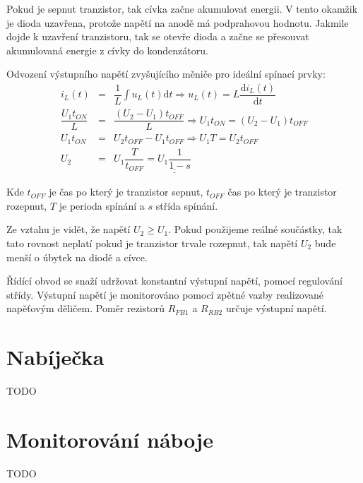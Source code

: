 Pokud je sepnut tranzistor, tak cívka začne akumulovat energii. V tento okamžik je dioda uzavřena, protože napětí na anodě má podprahovou hodnotu. Jakmile dojde k uzavření tranzistoru, tak se otevře dioda a začne se přesouvat akumulovaná energie z cívky do kondenzátoru.

Odvození výstupního napětí zvyšujícího měniče pro ideální spínací prvky:
\begin{eqnarray}
    i_L(t) &=& \dfrac{1}{L} \int u_L(t) \mathrm{d}t \Rightarrow u_L(t) = L \dfrac{\mathrm{d}i_L(t)}{\mathrm{d}t}
    \nonumber\\
    \dfrac{U_1 t_{ON}}{L} &=& \dfrac{(U_2 - U_1) t_{OFF}}{L} \Rightarrow U_1 t_{ON} = (U_2 - U_1) t_{OFF}
    \nonumber\\
    U_1 t_{ON} &=& U_2 t_{OFF} - U_1 t_{OFF} \Rightarrow U_1 T = U_2 t_{OFF}
    \nonumber\\
    U_2 &=& U_1 \dfrac{T}{t_{OFF}} = \underline{\underline{U_1 \dfrac{1}{1-s}}}
    \nonumber
\end{eqnarray}

Kde $t_{OFF}$ je čas po který je tranzistor sepnut, $t_{OFF}$ čas po který je tranzistor rozepnut, $T$ je perioda spínání a $s$ střída spínání.

Ze vztahu je vidět, že napětí $U_2 \geq U_1$. Pokud použijeme reálné součástky, tak tato rovnost neplatí pokud je tranzistor trvale rozepnut, tak napětí $U_2$ bude menší o úbytek na diodě a cívce.

Řídící obvod se snaží udržovat konstantní výstupní napětí, pomocí regulování střídy. Výstupní napětí je monitorováno pomocí zpětné vazby realizované napěťovým děličem. Poměr rezistorů $R_{FB1}$ a $R_{RB2}$ určuje výstupní napětí.

\section{Nabíječka}
TODO

\section{Monitorování náboje}
TODO
